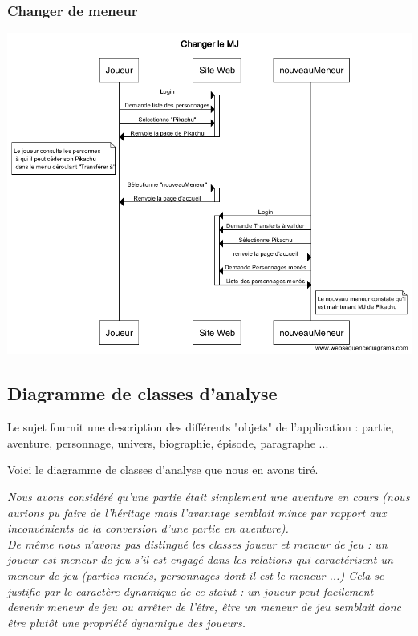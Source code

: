 \documentclass[a4paper, 11pt, titlepage]{article}
\begin{document}
\subsubsection{Changer de meneur}

\begin{center}
\includegraphics[scale=0.55]{sequence/ChangerleMJ.png}
\end{center}

\subsection{Diagramme de classes d'analyse}
Le sujet fournit une description des différents "objets" de l'application : partie, aventure, personnage, univers, biographie, épisode, paragraphe ...

Voici le diagramme de classes d'analyse que nous en avons tiré.

\textit{Nous avons considéré qu'une partie était simplement une aventure en cours (nous aurions pu faire de l'héritage mais l'avantage semblait mince par rapport aux inconvénients de la conversion d'une partie en aventure).\\
De même nous n'avons pas distingué les classes joueur et meneur de jeu : un joueur est meneur de jeu s'il est engagé dans les relations qui caractérisent un meneur de jeu (parties menés, personnages dont il est le meneur ...) Cela se justifie par le caractère dynamique de ce  statut : un joueur peut facilement devenir meneur de jeu ou arrêter de l'être, être un meneur de jeu semblait donc être plutôt une propriété dynamique des joueurs. }
\end{document}
